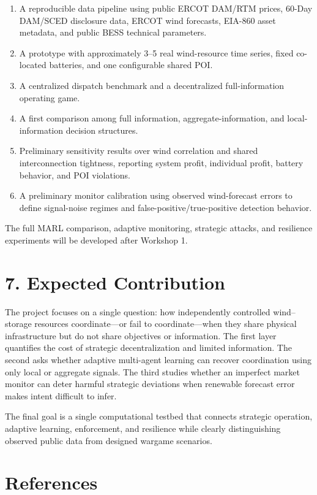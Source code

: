\documentclass[10pt]{article}
\begin{document}
\begin{enumerate}
    \item A reproducible data pipeline using public ERCOT DAM/RTM prices, 60-Day DAM/SCED disclosure data, ERCOT wind forecasts, EIA-860 asset metadata, and public BESS technical parameters.
    \item A prototype with approximately 3--5 real wind-resource time series, fixed co-located batteries, and one configurable shared POI.
    \item A centralized dispatch benchmark and a decentralized full-information operating game.
    \item A first comparison among full information, aggregate-information, and local-information decision structures.
    \item Preliminary sensitivity results over wind correlation and shared interconnection tightness, reporting system profit, individual profit, battery behavior, and POI violations.
    \item A preliminary monitor calibration using observed wind-forecast errors to define signal-noise regimes and false-positive/true-positive detection behavior.
\end{enumerate}

The full MARL comparison, adaptive monitoring, strategic attacks, and resilience experiments will be developed after Workshop 1.

\section*{7. Expected Contribution}

The project focuses on a single question: how independently controlled wind--storage resources coordinate---or fail to coordinate---when they share physical infrastructure but do not share objectives or information. The first layer quantifies the cost of strategic decentralization and limited information. The second asks whether adaptive multi-agent learning can recover coordination using only local or aggregate signals. The third studies whether an imperfect market monitor can deter harmful strategic deviations when renewable forecast error makes intent difficult to infer.

The final goal is a single computational testbed that connects strategic operation, adaptive learning, enforcement, and resilience while clearly distinguishing observed public data from designed wargame scenarios.

\section*{References}
\end{document}
